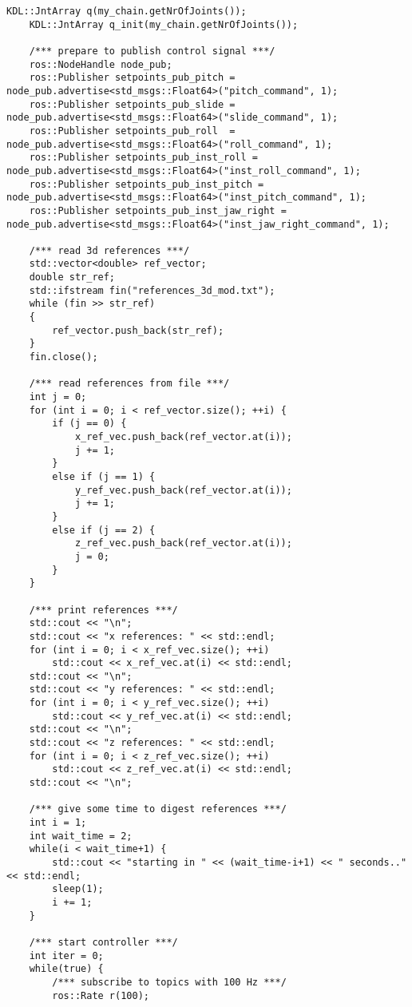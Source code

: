 \begin{lstlisting}[language=gedit]
    KDL::JntArray q(my_chain.getNrOfJoints());
    KDL::JntArray q_init(my_chain.getNrOfJoints());

    /*** prepare to publish control signal ***/ 
    ros::NodeHandle node_pub;
    ros::Publisher setpoints_pub_pitch = node_pub.advertise<std_msgs::Float64>("pitch_command", 1);
    ros::Publisher setpoints_pub_slide = node_pub.advertise<std_msgs::Float64>("slide_command", 1);
    ros::Publisher setpoints_pub_roll  = node_pub.advertise<std_msgs::Float64>("roll_command", 1);
    ros::Publisher setpoints_pub_inst_roll = node_pub.advertise<std_msgs::Float64>("inst_roll_command", 1);
    ros::Publisher setpoints_pub_inst_pitch = node_pub.advertise<std_msgs::Float64>("inst_pitch_command", 1);
    ros::Publisher setpoints_pub_inst_jaw_right = node_pub.advertise<std_msgs::Float64>("inst_jaw_right_command", 1);

    /*** read 3d references ***/
    std::vector<double> ref_vector;
    double str_ref;
    std::ifstream fin("references_3d_mod.txt"); 
    while (fin >> str_ref) 
    {  
        ref_vector.push_back(str_ref); 
    }
    fin.close(); 

    /*** read references from file ***/
    int j = 0;
    for (int i = 0; i < ref_vector.size(); ++i) {
        if (j == 0) {
            x_ref_vec.push_back(ref_vector.at(i));
            j += 1;
        }
        else if (j == 1) {
            y_ref_vec.push_back(ref_vector.at(i));
            j += 1;
        }
        else if (j == 2) {
            z_ref_vec.push_back(ref_vector.at(i));
            j = 0;
        }
    }

    /*** print references ***/
    std::cout << "\n";
    std::cout << "x references: " << std::endl;
    for (int i = 0; i < x_ref_vec.size(); ++i) 
        std::cout << x_ref_vec.at(i) << std::endl;
    std::cout << "\n";
    std::cout << "y references: " << std::endl;
    for (int i = 0; i < y_ref_vec.size(); ++i) 
        std::cout << y_ref_vec.at(i) << std::endl;
    std::cout << "\n";
    std::cout << "z references: " << std::endl;
    for (int i = 0; i < z_ref_vec.size(); ++i) 
        std::cout << z_ref_vec.at(i) << std::endl;
    std::cout << "\n";

    /*** give some time to digest references ***/
    int i = 1;
    int wait_time = 2;
    while(i < wait_time+1) {
        std::cout << "starting in " << (wait_time-i+1) << " seconds.." << std::endl;
        sleep(1);
        i += 1;
    }

    /*** start controller ***/
    int iter = 0;
    while(true) {
        /*** subscribe to topics with 100 Hz ***/
        ros::Rate r(100);
         

\end{lstlisting}
